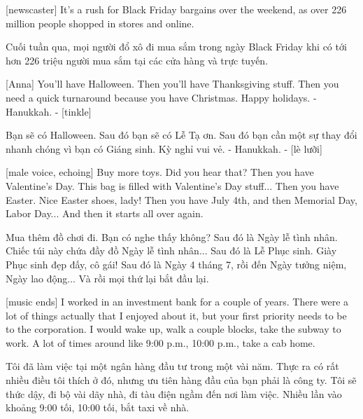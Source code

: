 \documentclass[a4paper]{article}
\begin{document}
	[newscaster] It's a rush for Black Friday bargains over the weekend, as over 226 million people shopped in stores and online.
	
	\begin{vietnamese-v2}
		 Cuối tuần qua, mọi người đổ xô đi mua sắm trong ngày Black Friday khi có tới hơn 226 triệu người mua sắm tại các cửa hàng và trực tuyến.
	\end{vietnamese-v2}
	
	[Anna] You'll have Halloween.
	Then you'll have Thanksgiving stuff.
	Then you need a quick turnaround because you have Christmas.
	Happy holidays.
	- Hanukkah. - [tinkle]
	
	\begin{vietnamese-v2}
		[Anna] Bạn sẽ có Halloween.
		Sau đó bạn sẽ có Lễ Tạ ơn.
		Sau đó bạn cần một sự thay đổi nhanh chóng vì bạn có Giáng sinh.
		Kỳ nghỉ vui vẻ.
		- Hanukkah. - [lè lưỡi]
	\end{vietnamese-v2}
	
	[male voice, echoing] Buy more toys.
	Did you hear that?
	Then you have Valentine's Day.
	This bag is filled with Valentine's Day stuff...
	Then you have Easter.
	Nice Easter shoes, lady!
	Then you have July 4th, and then Memorial Day, Labor Day...
	And then it starts all over again.
	
	\begin{vietnamese-v2}
		 Mua thêm đồ chơi đi.
		Bạn có nghe thấy không?
		Sau đó là Ngày lễ tình nhân.
		Chiếc túi này chứa đầy đồ Ngày lễ tình nhân...
		Sau đó là Lễ Phục sinh.
		Giày Phục sinh đẹp đấy, cô gái!
		Sau đó là Ngày 4 tháng 7, rồi đến Ngày tưởng niệm, Ngày lao động...
		Và rồi mọi thứ lại bắt đầu lại.	
	\end{vietnamese-v2}
	
	[music ends]
	I worked in an investment bank for a couple of years.
	There were a lot of things actually that I enjoyed about it, but your first priority needs to be to the corporation.
	I would wake up, walk a couple blocks, take the subway to work.
	A lot of times around like 9:00 p.m., 10:00 p.m., take a cab home.
	
	\begin{vietnamese-v2}
		Tôi đã làm việc tại một ngân hàng đầu tư trong một vài năm.
		Thực ra có rất nhiều điều tôi thích ở đó, nhưng ưu tiên hàng đầu của bạn phải là công ty.
		Tôi sẽ thức dậy, đi bộ vài dãy nhà, đi tàu điện ngầm đến nơi làm việc.
		Nhiều lần vào khoảng 9:00 tối, 10:00 tối, bắt taxi về nhà.
	\end{vietnamese-v2}
	
\end{document}
